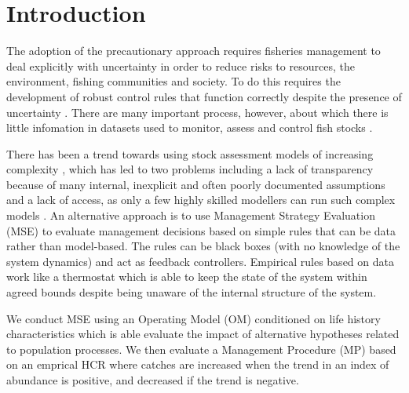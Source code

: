 \documentclass[12pt,doublespacing,a4paper]{ouparticle}
\begin{document}
\date{\today}

\keywords{}
 
\maketitle

\newpage


\linenumbers
\linespread{2}


\section{Introduction}

The adoption of the precautionary approach \citep[PA,][]{garcia1996precautionary} requires fisheries management to deal explicitly with uncertainty in order to reduce risks to resources, the environment, fishing communities and society. To do this requires the development of robust control rules that function correctly despite the presence of uncertainty \citep{radatz1990ieee, zhou1996robust}. There are many important process, however, about which there is little infomation in datasets used to monitor, assess and control fish stocks  \citep[e.g.][]{bjoernstad2004trends, botsford}.  

There has been a trend towards using stock assessment models of increasing complexity \citep[e.g][]{}, which has led to two problems including a lack of transparency because of many internal, inexplicit and often poorly documented assumptions and a lack of access, as only a few highly skilled modellers can run such complex models \citep{hilborn2003state}.  An alternative approach is to use Management Strategy Evaluation (MSE) to evaluate management decisions based on simple rules that can be data rather than model-based. The rules can be black boxes (with no knowledge of the system dynamics) and act as feedback controllers. Empirical rules based on data work like a thermostat which is able to keep the state of the system within agreed bounds despite being unaware of the internal structure of the system. 

We conduct MSE using an Operating Model (OM) conditioned on life history characteristics which is able evaluate the impact of alternative hypotheses related to population processes. We then evaluate a Management Procedure (MP) based on an emprical HCR where catches are increased when the trend in an index of abundance is positive, and decreased if the trend is negative. 
\end{document}
